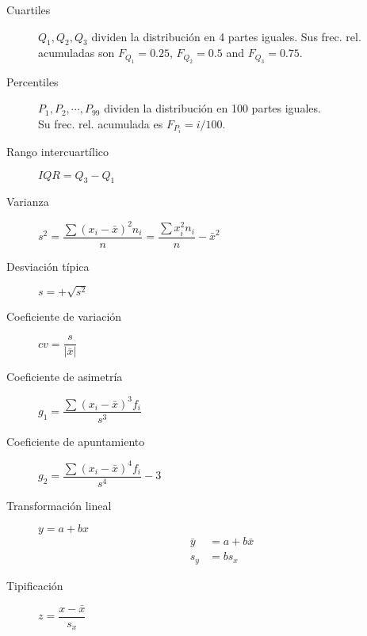 \begin{multicols*}{2}
	\begin{tcolorbox}[hbox, title=Estadísticos de posición]
		\begin{minipage}{0.4\textwidth}
			\begin{description}
				\item [Cuartiles] $Q_1,Q_2,Q_3$ dividen la distribución en 4 partes iguales.
				      Sus frec. rel. acumuladas son
				      $F_{Q_1}=0.25$, $F_{Q_2}=0.5$ and $F_{Q_3}=0.75$.
				\item [Percentiles] $P_1,P_2,\cdots,P_{99}$ dividen la distribución en 100 partes iguales.\\
				      Su frec. rel. acumulada es $F_{P_i}=i/100$.
			\end{description}
		\end{minipage}
	\end{tcolorbox}

	\begin{tcolorbox}[hbox, title=Estadísticos de dispersión]
		\begin{minipage}{0.4\textwidth}
			\begin{description}
				\item [Rango intercuartílico] $IQR=Q_3-Q_1$
				\item [Varianza] $s^2=\dfrac{\sum (x_i-\bar x)^2n_i}{n}=\dfrac{\sum x_i^2n_i}{n}-\bar x^2$
				\item [Desviación típica] $s=+\sqrt{s^2}$
				\item [Coeficiente de variación] $cv=\dfrac{s}{|\bar{x}|}$
			\end{description}
		\end{minipage}
	\end{tcolorbox}

	\begin{tcolorbox}[hbox, title=Estadísticos de forma]
		\begin{minipage}{0.4\textwidth}
			\begin{description}
				\item [Coeficiente de asimetría] $g_1=\dfrac{\sum(x_i-\bar{x})^3f_i}{s^3}$
				\item [Coeficiente de apuntamiento] $g_2=\dfrac{\sum(x_i-\bar{x})^4f_i}{s^4}-3$
			\end{description}
		\end{minipage}
	\end{tcolorbox}

	\begin{tcolorbox}[hbox, title=Transformaciones lineales]
		\begin{minipage}{0.4\textwidth}
			\begin{description}
				\item[Transformación lineal] $y=a+bx$
				      \begin{align*}
					      \bar y & = a+b\bar x \\
					      s_y    & = bs_x
				      \end{align*}
				\item[Tipificación] $z=\dfrac{x-\bar x}{s_x}$
			\end{description}
		\end{minipage}
	\end{tcolorbox}



\end{multicols*}

